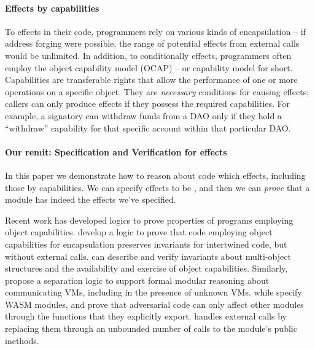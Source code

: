 \paragraph{Effects \tamed by capabilities} 
To \tame  effects  in their code, 
programmers    rely on various kinds of  encapsulation -- \eg if address forging were possible, the range of potential effects from external calls would be unlimited.
In addition, to conditionally \tame effects, programmers often 
employ  the object capability model (OCAP)\cite{MillerPhD} --
 or capability model for short. 
Capabilities are transferable rights that allow the performance of one or more operations on a specific object. 
They are {\emph{necessary}} conditions for causing effects; callers can only produce effects if they possess the required capabilities. 
For example, a signatory can withdraw funds from a DAO only if they hold a ``withdraw'' capability for that specific account within that particular DAO.  



\paragraph{Our remit:  Specification and Verification for  \tamed effects}
In this paper we demonstrate how to reason about  code which \tames effects,
{including those \tamed by capabilities.}  
We can specify effects to be \tamed, 
and then we can \emph{prove} that a module has indeed \tamed the effects we've specified.

Recent work has developed logics to prove properties of programs employing object capabilities.
\citet{ddd} develop a logic to prove that code employing object
capabilities for encapsulation preserves invariants for
intertwined code, but without external calls. 
  \citet{dd}  can describe and verify invariants
about multi-object structures and the availability and exercise of object capabilities.  %
 Similarly,
{\citet{vmsl-pldi2023} propose a separation logic to support formal modular reasoning about communicating VMs, including in the presence of unknown VMs.
while \cite{irisWasm23} specify WASM modules, %
and prove that adversarial code  can only affect other modules through the functions} that they explicitly export. 
\citet{CassezFQ24}  handles external calls by replacing them through an unbounded number of calls to the module's public methods.
 
